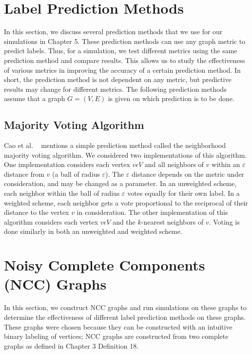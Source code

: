 \section{Label Prediction Methods}
In this section, we discuss several prediction methods that we use for our simulations in Chapter 5. These prediction methods can use any graph metric to predict labels. Thus, for a simulation, we test different metrics using the same prediction method and compare results. This allows us to study the effectiveness of various metrics in improving the accuracy of a certain prediction method. In short, the prediction method is not dependent on any metric, but predictive results may change for different metrics. The following prediction methods assume that a graph $G=(V,E)$ is given on which prediction is to be done.

\subsection{Majority Voting Algorithm}
Cao et al. ~\cite{10.1371/journal.pone.0076339} mentions a simple prediction method called the neighborhood majority voting algorithm. We considered two implementations of this algorithm. One implementation considers each vertex $v \epsilon V$ and all neighbors of $v$ within an $\varepsilon$ distance from $v$ (a ball of radius $\varepsilon$). The $\varepsilon$ distance depends on the metric under consideration, and may be changed as a parameter. In an unweighted scheme, each neighbor within the ball of radius $\varepsilon$ votes equally for their own label. In a weighted scheme, each neighbor gets a vote proportional to the reciprocal of their distance to the vertex $v$ in consideration. The other implementation of this algorithm considers each vertex $v \epsilon V$ and the $k$-nearest neighbors of $v$. Voting is done similarly in both an unweighted and weighted scheme.


\section{Noisy Complete Components (NCC) Graphs}
In this section, we construct NCC graphs and run simulations on these graphs to determine the effectiveness of different label prediction methods on these graphs. These graphs were chosen because they can be constructed with an intuitive binary labeling of vertices; NCC graphs are constructed from two complete graphs as defined in Chapter 3 Definition 18.

